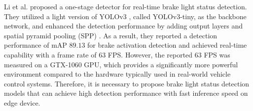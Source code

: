 Li et al. \cite{li2020highly} proposed a one-stage detector for real-time brake light status detection. 
They utilized a light version of YOLOv3 \cite{redmon2018yolov3}, called YOLOv3-tiny, as the backbone network, and enhanced the detection performance by adding output layers and spatial pyramid pooling (SPP) \cite{he2015spatial}. 
As a result, they reported a detection performance of mAP $89.13$ for brake activation detection and achieved real-time capability with a frame rate of $63$ FPS.
However, the reported $63$ FPS was measured on a GTX-1060 GPU, which provides a significantly more powerful environment compared to the hardware typically used in real-world vehicle control systems. 
Therefore, it is necessary to propose brake light status detection models that can achieve high detection performance with fast inference speed on edge device.


